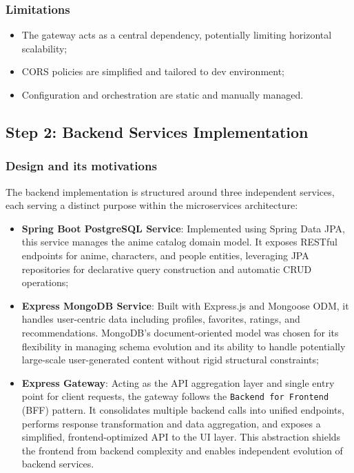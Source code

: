 \documentclass[11pt,a4paper]{article}
\begin{document}
\subsubsection{Limitations}
\begin{itemize}
    \item The gateway acts as a central dependency, potentially limiting horizontal scalability;
    \item CORS policies are simplified and tailored to dev environment;
    \item Configuration and orchestration are static and manually managed.
\end{itemize}





\newpage
\subsection{Step 2: Backend Services Implementation}

\subsubsection{Design and its motivations}
The backend implementation is structured around three independent services, each serving a distinct purpose within the microservices architecture:
\begin{itemize}
    \item \textbf{Spring Boot PostgreSQL Service}: Implemented using Spring Data JPA, this service manages the anime catalog domain model. It exposes RESTful endpoints for anime, characters, and people entities, leveraging JPA repositories for declarative query construction and automatic CRUD operations;

    \item \textbf{Express MongoDB Service}: Built with Express.js and Mongoose ODM, it handles user-centric data including profiles, favorites, ratings, and recommendations. MongoDB's document-oriented model was chosen for its flexibility in managing schema evolution and its ability to handle potentially large-scale user-generated content without rigid structural constraints;

    \item \textbf{Express Gateway}: Acting as the API aggregation layer and single entry point for client requests, the gateway follows the \texttt{Backend for Frontend} (BFF) pattern. It consolidates multiple backend calls into unified endpoints, performs response transformation and data aggregation, and exposes a simplified, frontend-optimized API to the UI layer. This abstraction shields the frontend from backend complexity and enables independent evolution of backend services.
\end{itemize}
\end{document}
